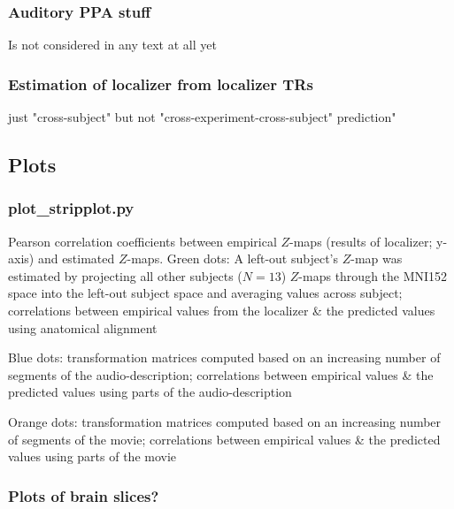 \subsubsection{Auditory PPA stuff}

Is not considered in any text at all yet


\subsubsection{Estimation of localizer from localizer TRs}

just "cross-subject" but not "cross-experiment-cross-subject" prediction"


\subsection{Plots}

\subsubsection{plot\_stripplot.py}

%
Pearson correlation coefficients between empirical $Z$-maps (results of
localizer; y-axis) and estimated $Z$-maps.
%
Green dots: A left-out subject's $Z$-map was estimated by projecting all other
subjects ($N = 13$) $Z$-maps through the MNI152 space into the left-out subject
space and averaging values across subject; correlations between empirical values
from the localizer \& the predicted values using anatomical alignment

%
Blue dots: transformation matrices computed based on an increasing number of
segments of the audio-description; correlations between empirical values \& the
predicted values using parts of the audio-description

%
Orange dots: transformation matrices computed based on an increasing number of
segments of the movie; correlations between empirical values \& the predicted
values using parts of the movie


\subsubsection{Plots of brain slices?}



